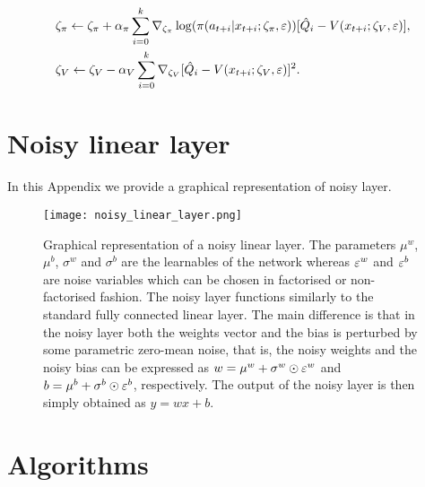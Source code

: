 \documentclass{article}
\begin{document}
 \begin{align}
 &\zeta_\pi \leftarrow \zeta_\pi + \alpha_\pi\sum_{i=0}^k\nabla_{\zeta_\pi}\log(\pi(a_{t+i}|x_{t+i};\zeta_\pi,\varepsilon))[\hat{Q}_i-V(x_{t+i};\zeta_V,\varepsilon)],
 \\
 &\zeta_V \leftarrow \zeta_V -\alpha_V\sum_{i=0}^k\nabla_{\zeta_V}[\hat{Q}_i-V(x_{t+i};\zeta_V,\varepsilon)]^2.
 \end{align}



\newpage

\section{Noisy linear layer}
 \label{sec:noisy linear layer}
 
 In this Appendix we provide a graphical representation of noisy layer.
 
\begin{figure}[!htp]
\begin{centering}
    \texttt{[image: noisy\_linear\_layer.png]}
    \caption{Graphical representation of a noisy linear layer. The parameters $\mu^w$, $\mu^b$, $\sigma^w$ and $\sigma^b$ are the learnables of the network whereas $\varepsilon^w$  and $\varepsilon^b$ are noise  variables which can be chosen in factorised or non-factorised fashion. The noisy layer functions similarly to the standard fully connected linear layer. The main difference is that in the noisy layer both the weights vector and the bias is perturbed by some parametric zero-mean noise, that is, the noisy weights and the noisy bias can be expressed as $w=\mu^w+\sigma^w\odot\varepsilon^w$ and $b=\mu^b+\sigma^b\odot\varepsilon^b$, respectively. The output of the noisy layer is then simply obtained as $y=wx+b$.}
    \label{fig:noisy linear layer} 
    \end{centering}
\end{figure}

\newpage


\section{Algorithms}
\end{document}

